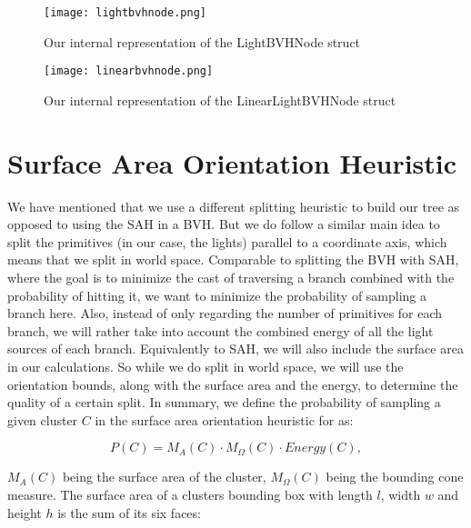 \begin{figure}
	\begin{center}
		\texttt{[image: lightbvhnode.png]}
		\caption{Our internal representation of the LightBVHNode struct}
		\label{fig:lightbvhnode}
	\end{center}
\end{figure}

\begin{figure}
	\begin{center}
		\texttt{[image: linearbvhnode.png]}
		\caption{Our internal representation of the LinearLightBVHNode struct}
		\label{fig:linearlightbvhnode}
	\end{center}
\end{figure}

\section{Surface Area Orientation Heuristic}
\label{sec:saoh}

We have mentioned that we use a different splitting heuristic to build our tree as opposed to using the SAH in a BVH. But we do follow a similar main idea to split the primitives (in our case, the lights) parallel to a coordinate axis, which means that we split in world space. Comparable to splitting the BVH with SAH, where the goal is to minimize the cast of traversing a branch combined with the probability of hitting it, we want to minimize the probability of sampling a branch here. Also, instead of only regarding the number of primitives for each branch, we will rather take into account the combined energy of all the light sources of each branch. Equivalently to SAH, we will also include the surface area in our calculations. So while we do split in world space, we will use the orientation bounds, along with the surface area and the energy, to determine the quality of a certain split. In summary, we define the probability of sampling a given cluster $C$ in the surface area orientation heuristic for as:

\begin{equation}
P(C) = M_A(C) \cdot M_\Omega(C) \cdot Energy(C),
\end{equation}

$M_A(C)$ being the surface area of the cluster, $M_\Omega(C)$ being the bounding cone measure. The surface area of a clusters bounding box with length $l$, width $w$ and height $h$ is the sum of its six faces:

